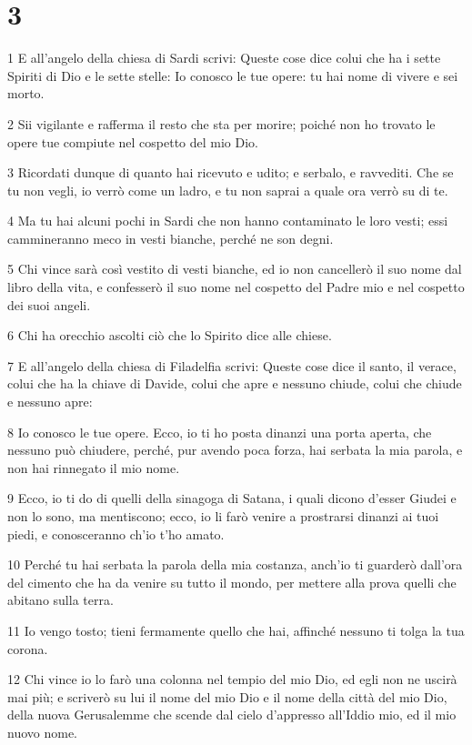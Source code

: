 \chapter{3}

\par 1 E all'angelo della chiesa di Sardi scrivi: Queste cose dice colui che ha i sette Spiriti di Dio e le sette stelle: Io conosco le tue opere: tu hai nome di vivere e sei morto.
\par 2 Sii vigilante e rafferma il resto che sta per morire; poiché non ho trovato le opere tue compiute nel cospetto del mio Dio.
\par 3 Ricordati dunque di quanto hai ricevuto e udito; e serbalo, e ravvediti. Che se tu non vegli, io verrò come un ladro, e tu non saprai a quale ora verrò su di te.
\par 4 Ma tu hai alcuni pochi in Sardi che non hanno contaminato le loro vesti; essi cammineranno meco in vesti bianche, perché ne son degni.
\par 5 Chi vince sarà così vestito di vesti bianche, ed io non cancellerò il suo nome dal libro della vita, e confesserò il suo nome nel cospetto del Padre mio e nel cospetto dei suoi angeli.
\par 6 Chi ha orecchio ascolti ciò che lo Spirito dice alle chiese.
\par 7 E all'angelo della chiesa di Filadelfia scrivi: Queste cose dice il santo, il verace, colui che ha la chiave di Davide, colui che apre e nessuno chiude, colui che chiude e nessuno apre:
\par 8 Io conosco le tue opere. Ecco, io ti ho posta dinanzi una porta aperta, che nessuno può chiudere, perché, pur avendo poca forza, hai serbata la mia parola, e non hai rinnegato il mio nome.
\par 9 Ecco, io ti do di quelli della sinagoga di Satana, i quali dicono d'esser Giudei e non lo sono, ma mentiscono; ecco, io li farò venire a prostrarsi dinanzi ai tuoi piedi, e conosceranno ch'io t'ho amato.
\par 10 Perché tu hai serbata la parola della mia costanza, anch'io ti guarderò dall'ora del cimento che ha da venire su tutto il mondo, per mettere alla prova quelli che abitano sulla terra.
\par 11 Io vengo tosto; tieni fermamente quello che hai, affinché nessuno ti tolga la tua corona.
\par 12 Chi vince io lo farò una colonna nel tempio del mio Dio, ed egli non ne uscirà mai più; e scriverò su lui il nome del mio Dio e il nome della città del mio Dio, della nuova Gerusalemme che scende dal cielo d'appresso all'Iddio mio, ed il mio nuovo nome.
